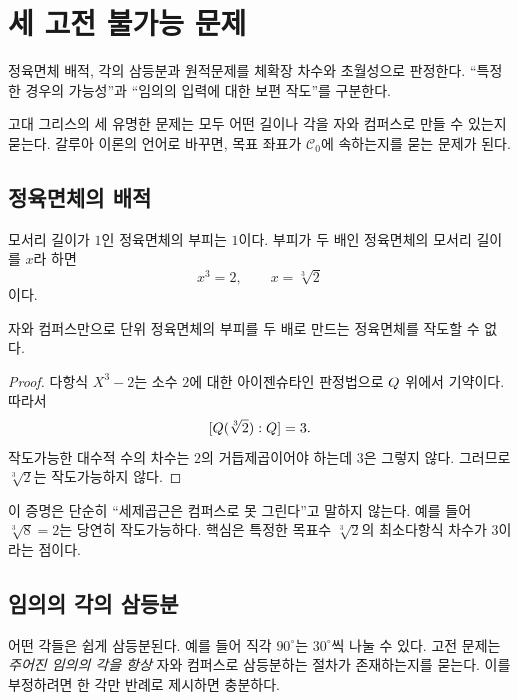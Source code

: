 \clearpage
\section{세 고전 불가능 문제}
\label{sec:construction-classical-impossibilities}

\begin{learninggoal}
정육면체 배적, 각의 삼등분과 원적문제를 체확장 차수와 초월성으로 판정한다. ``특정한 경우의 가능성''과 ``임의의 입력에 대한 보편 작도''를 구분한다.
\end{learninggoal}

고대 그리스의 세 유명한 문제는 모두 어떤 길이나 각을 자와 컴퍼스로 만들 수 있는지 묻는다. 갈루아 이론의 언어로 바꾸면, 목표 좌표가 $\mathcal C_0$에 속하는지를 묻는 문제가 된다.

\subsection{정육면체의 배적}

모서리 길이가 $1$인 정육면체의 부피는 $1$이다. 부피가 두 배인 정육면체의 모서리 길이를 $x$라 하면
\[
  x^3=2,
  \qquad
  x=\sqrt[3]{2}
\]
이다.

\begin{theorem}
자와 컴퍼스만으로 단위 정육면체의 부피를 두 배로 만드는 정육면체를 작도할 수 없다.
\end{theorem}

\begin{proof}
다항식 $X^3-2$는 소수 $2$에 대한 아이젠슈타인 판정법으로 $Q$ 위에서 기약이다. 따라서
\[
  [Q(\sqrt[3]2):Q]=3.
\]
작도가능한 대수적 수의 차수는 $2$의 거듭제곱이어야 하는데 $3$은 그렇지 않다. 그러므로 $\sqrt[3]2$는 작도가능하지 않다.
\end{proof}

이 증명은 단순히 ``세제곱근은 컴퍼스로 못 그린다''고 말하지 않는다. 예를 들어 $\sqrt[3]8=2$는 당연히 작도가능하다. 핵심은 특정한 목표수 $\sqrt[3]2$의 최소다항식 차수가 $3$이라는 점이다.

\subsection{임의의 각의 삼등분}

어떤 각들은 쉽게 삼등분된다. 예를 들어 직각 $90^\circ$는 $30^\circ$씩 나눌 수 있다. 고전 문제는 \emph{주어진 임의의 각을 항상} 자와 컴퍼스로 삼등분하는 절차가 존재하는지를 묻는다. 이를 부정하려면 한 각만 반례로 제시하면 충분하다.

